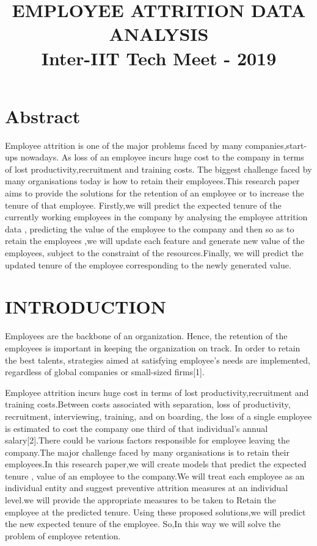 \documentclass[a4paper, 14 pt, conference]{ieeeconf}
\title{\LARGE \bf %
EMPLOYEE ATTRITION DATA ANALYSIS
\\
\textnormal{\bf  Inter-IIT Tech Meet - 2019}
\centering{\author{ \bf Team - Gritty Britters, IIT Kanpur}
}
}
\begin{document}
\maketitle
\thispagestyle{plain}
\pagestyle{plain}
\section{Abstract}

 Employee attrition is one of the major problems faced by many companies,start-ups nowadays. As loss of an employee incurs huge cost to the company in terms of lost productivity,recruitment and training costs. The biggest challenge faced by many organisations today is how to retain their employees.This research paper aims to provide the solutions for the retention of an employee or to increase the tenure of that employee. Firstly,we will predict the expected tenure of the currently working employees in the company by analysing the employee attrition data , predicting the value of the employee to the company and then so as to retain the employees ,we will update each feature and generate new value of the employees, subject to the constraint of the resources.Finally, we will predict the updated tenure of the employee corresponding to the newly generated value.     
 






\section{INTRODUCTION}

 Employees are the backbone of an organization. Hence, the retention of the employees is important in keeping the organization on track. In order to retain the best talents, strategies aimed at satisfying employee’s needs are implemented, regardless of global companies or
 small-sized firms[1].
 
 Employee attrition incurs huge cost in terms of lost productivity,recruitment and training costs.Between costs associated with separation, loss of productivity, recruitment, interviewing, training, and on boarding, the loss of a single employee is estimated to cost the company one third of that individual’s annual salary[2].There could be various factors responsible for employee leaving the company.The major challenge faced by many organisations is to retain their employees.In this research paper,we will create models that predict the expected tenure , value of an employee to the company.We will treat each employee as an individual entity and suggest preventive attrition measures at an individual level.we will provide the appropriate measures to be taken to Retain the employee at the predicted tenure. Using these proposed solutions,we will predict the new  expected tenure of the employee. So,In this way we will solve the problem of employee retention.  
 
\end{document}
